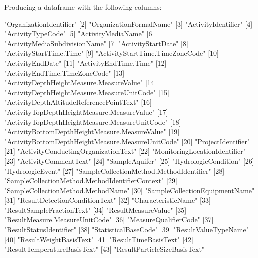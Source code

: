 \documentclass[a4paper,11pt]{article}
\begin{document}
Producing a dataframe with the following columns:
\begin{Schunk}
\begin{Soutput}
 [1] "OrganizationIdentifier"                           
 [2] "OrganizationFormalName"                           
 [3] "ActivityIdentifier"                               
 [4] "ActivityTypeCode"                                 
 [5] "ActivityMediaName"                                
 [6] "ActivityMediaSubdivisionName"                     
 [7] "ActivityStartDate"                                
 [8] "ActivityStartTime.Time"                           
 [9] "ActivityStartTime.TimeZoneCode"                   
[10] "ActivityEndDate"                                  
[11] "ActivityEndTime.Time"                             
[12] "ActivityEndTime.TimeZoneCode"                     
[13] "ActivityDepthHeightMeasure.MeasureValue"          
[14] "ActivityDepthHeightMeasure.MeasureUnitCode"       
[15] "ActivityDepthAltitudeReferencePointText"          
[16] "ActivityTopDepthHeightMeasure.MeasureValue"       
[17] "ActivityTopDepthHeightMeasure.MeasureUnitCode"    
[18] "ActivityBottomDepthHeightMeasure.MeasureValue"    
[19] "ActivityBottomDepthHeightMeasure.MeasureUnitCode" 
[20] "ProjectIdentifier"                                
[21] "ActivityConductingOrganizationText"               
[22] "MonitoringLocationIdentifier"                     
[23] "ActivityCommentText"                              
[24] "SampleAquifer"                                    
[25] "HydrologicCondition"                              
[26] "HydrologicEvent"                                  
[27] "SampleCollectionMethod.MethodIdentifier"          
[28] "SampleCollectionMethod.MethodIdentifierContext"   
[29] "SampleCollectionMethod.MethodName"                
[30] "SampleCollectionEquipmentName"                    
[31] "ResultDetectionConditionText"                     
[32] "CharacteristicName"                               
[33] "ResultSampleFractionText"                         
[34] "ResultMeasureValue"                               
[35] "ResultMeasure.MeasureUnitCode"                    
[36] "MeasureQualifierCode"                             
[37] "ResultStatusIdentifier"                           
[38] "StatisticalBaseCode"                              
[39] "ResultValueTypeName"                              
[40] "ResultWeightBasisText"                            
[41] "ResultTimeBasisText"                              
[42] "ResultTemperatureBasisText"                       
[43] "ResultParticleSizeBasisText"                      

\end{Soutput}
\end{Schunk}
\end{document}
